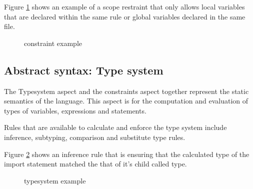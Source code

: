 Figure \ref{fig:constraint_example} shows an example of a scope restraint that only allows local variables that are declared within the same rule or global variables declared in the same file.

\begin{figure}[h]
    \centering
    \caption{constraint example}
    \label{fig:constraint_example}
\end{figure}
 

\subsection{Abstract syntax: Type system}
The Typesystem aspect and the constraints aspect together represent the static semantics of the language.
This aspect is for the computation and evaluation of types of variables, expressions and statements.

Rules that are available to calculate and enforce the type system include inference, subtyping, comparison and substitute type rules.

Figure \ref{fig:typesystem_example} shows an inference rule that is ensuring that the calculated type of the import statement matched the that of it's child called type.

\begin{figure}[h]
    \centering
    \caption{typesystem example}
    \label{fig:typesystem_example}
\end{figure}
 

